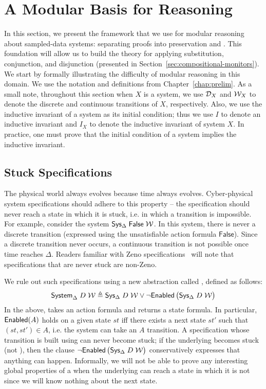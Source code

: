 \section{A Modular Basis for Reasoning}
\label{sec:compositional-basis}
In this section, we present the framework that we use for modular reasoning
about sampled-data systems: separating proofs into preservation and
\progress{}.  This foundation will allow us to build the theory for
applying substitution, conjunction, and disjunction (presented in
Section~\ref{sec:compositional-monitors}).  We start by formally
illustrating the difficulty of modular reasoning in this domain. We use the
notation and definitions from Chapter~\ref{chap:prelim}. As a small note,
throughout this section when $X$ is a system, we use $\mathcal{D}_X$ and $\mathcal{W}_X$ to
denote the discrete and continuous transitions of $X$, respectively.  Also,
we use the inductive invariant of a system as its initial condition; thus
we use $I$ to denote an inductive invariant and $I_X$ to denote the
inductive invariant of system $X$.  In practice, one must prove that the
initial condition of a system implies the inductive invariant.

\subsection{Stuck Specifications}
The physical world always evolves because time always evolves.
Cyber-physical system specifications should adhere to this property -- the
specification should never reach a state in which it is stuck, i.e. in
which a transition is impossible.  For example, consider the system
${\textsf{Sys}}{}_{\Delta}\;\mathsf{False}\;\mathcal{W}$.  In this system, there is never a
discrete transition (expressed using the unsatisfiable action formula
$\mathsf{False}$).  Since a discrete transition never occurs, a continuous
transition is not possible once time reaches $\Delta$.  Readers familiar
with Zeno specifications~\cite{abadi1994realtime} will note that \SysA{}
specifications that are never stuck are non-Zeno.

We rule out such specifications using a new abstraction called \System,
defined as follows:
\[
\mathsf{System}_{\Delta}\;D\;\mathcal{W} \triangleq {\textsf{Sys}}{}_{\Delta}\;D\;\mathcal{W} \vee \neg \textsf{Enabled}\, \big({\textsf{Sys}}{}_{\Delta}\;D\;\mathcal{W}\big)
\]
In the above, \Enabled takes an action formula and returns a state formula.
In particular, $\textsf{Enabled} (A)$ holds on a given state $st$ iff there exists
a next state $st'$ such that $(st, st')\in A$, i.e. the system can take an
$A$ transition.  A specification whose transition is built using \System
can never become stuck; if the underlying \SysA{} becomes stuck (not
\Enabled), then the clause $\neg \textsf{Enabled}\, \big({\textsf{Sys}}{}_{\Delta}\;D\;\mathcal{W}\big)$
conservatively expresses that anything can happen.  Informally, we will not
be able to prove any interesting global properties of a \System when the
underlying \SysA{} can reach a state in which it is not \Enabled since we
will know nothing about the next state.

